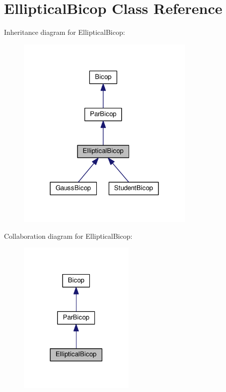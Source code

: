 \hypertarget{class_elliptical_bicop}{\section{Elliptical\+Bicop Class Reference}
\label{class_elliptical_bicop}
}


Inheritance diagram for Elliptical\+Bicop\+:\nopagebreak
\begin{figure}[H]
\begin{center}
\leavevmode
\includegraphics[width=243pt]{class_elliptical_bicop__inherit__graph}
\end{center}
\end{figure}


Collaboration diagram for Elliptical\+Bicop\+:\nopagebreak
\begin{figure}[H]
\begin{center}
\leavevmode
\includegraphics[width=158pt]{class_elliptical_bicop__coll__graph}
\end{center}
\end{figure}
